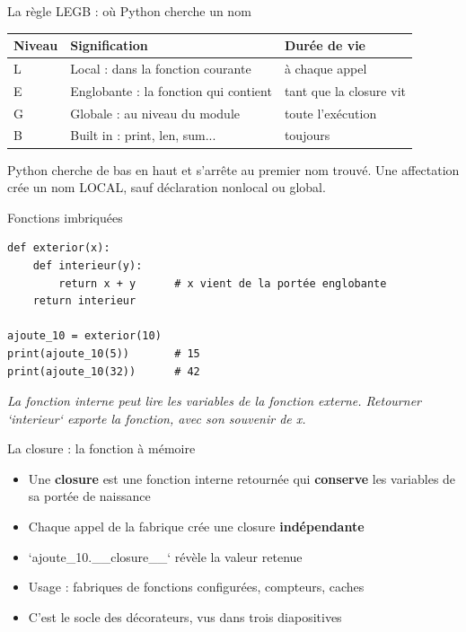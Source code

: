 \documentclass[aspectratio=169,11pt]{beamer}
\begin{document}
\begin{frame}{La règle LEGB : où Python cherche un nom}
\renewcommand{\arraystretch}{1.3}\small
\begin{center}
\begin{tabular}{lll}
\toprule
\textbf{\color{PyBleu}Niveau} & \textbf{\color{PyBleu}Signification} & \textbf{\color{PyBleu}Durée de vie} \\
\midrule
L & Local : dans la fonction courante & à chaque appel \\
E & Englobante : la fonction qui contient & tant que la closure vit \\
G & Globale : au niveau du module & toute l'exécution \\
B & Built in : print, len, sum... & toujours \\
\bottomrule
\end{tabular}
\end{center}

\vspace{4pt}

{\small\color{PyGris}Python cherche de bas en haut et s'arrête au premier nom trouvé. Une affectation crée un nom LOCAL, sauf déclaration nonlocal ou global.}
\end{frame}

\begin{frame}[fragile]{Fonctions imbriquées}

\begin{lstlisting}[style=py]
def exterior(x):
    def interieur(y):
        return x + y      # x vient de la portée englobante
    return interieur

ajoute_10 = exterior(10)
print(ajoute_10(5))       # 15
print(ajoute_10(32))      # 42
\end{lstlisting}
\vspace{0.5pt}

{\small\color{PyGris}\itshape La fonction interne peut lire les variables de la fonction externe. Retourner `interieur` exporte la fonction, avec son souvenir de x.}

\end{frame}

\begin{frame}{La closure : la fonction à mémoire}
\begin{itemize}
  \item Une \textbf{closure} est une fonction interne retournée qui \textbf{conserve} les variables de sa portée de naissance
  \item Chaque appel de la fabrique crée une closure \textbf{indépendante}
  \item `ajoute\_10.\_\_closure\_\_` révèle la valeur retenue
  \item Usage : fabriques de fonctions configurées, compteurs, caches
  \item C'est le socle des décorateurs, vus dans trois diapositives
\end{itemize}
\end{frame}
\end{document}
